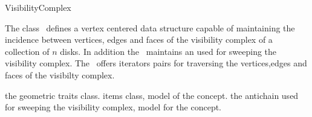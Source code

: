 
\ccRefPageBegin


\begin{ccRefConcept}{VisibilityComplex}
\label{pageVisibilityComplexRef}

\ccDefinition
  
The class \ccRefName\ defines a vertex centered data structure capable of
maintaining the incidence between vertices, edges and faces of the visibility
complex of a collection of $n$ disks. In addition the \ccRefName\ maintains an
 used for sweeping the visibility complex.  The
\ccRefName\ offers iterators pairs for traversing the vertices,edges and faces
of the visibilty complex.

\ccTypes
{}

 {the geometric traits class.}
\ccGlue
{} {items class, model of the 
		      concept.}
\ccGlue
{} {the antichain used for sweeping the visibility
			  complex, model for the 
			   concept.}
\ccGlue
{}
\ccGlue
{}
\ccGlue
{}
\ccGlue
{}
\ccGlue
{}
\ccGlue
{}
\ccGlue
{}


\end{ccRefConcept}
